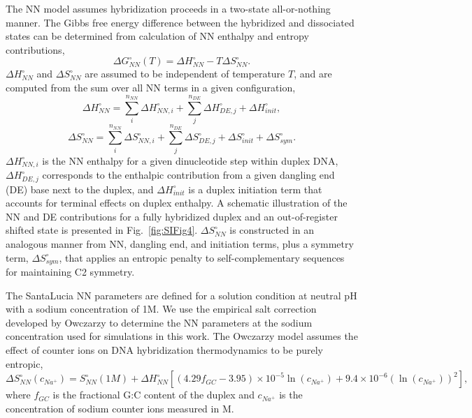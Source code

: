 \documentclass[journal=jpcbfk,manuscript=article]{achemso}
\begin{document}
The NN model assumes hybridization proceeds in a two-state all-or-nothing manner. The Gibbs free energy difference between the hybridized and dissociated states can be determined from calculation of NN enthalpy and entropy contributions,
\begin{equation}\label{SIe1}
\Delta G_{NN}^{\circ}(T) = \Delta H_{NN}^{\circ} - T\Delta S_{NN}^{\circ}.
\end{equation}
$\Delta H_{NN}^{\circ}$ and $\Delta S_{NN}^{\circ}$ are assumed to be independent of temperature $T$, and are computed from the sum over all NN terms in a given configuration,
\begin{equation}\label{SIe2}
\Delta H_{NN}^{\circ} = \sum_{i}^{n_{NN}}\Delta H_{NN, i}^{\circ} + \sum_{j}^{n_{DE}}\Delta H_{DE, j}^{\circ} + \Delta H_{init}^{\circ},
\end{equation}
\begin{equation}\label{SIe3}
\Delta S_{NN}^{\circ} = \sum_{i}^{n_{NN}}\Delta S_{NN, i}^{\circ} + \sum_{j}^{n_{DE}}\Delta S_{DE, j}^{\circ} + \Delta S_{init}^{\circ} + \Delta S_{sym}^{\circ}.
\end{equation}                          
$\Delta H_{NN, i}^{\circ}$ is the NN enthalpy for a given dinucleotide step within duplex DNA, $\Delta H_{DE, j}^{\circ}$ corresponds to the enthalpic contribution from a given dangling end (DE) base next to the duplex\citep{Santalucia2004TM}, and $\Delta H_{init}^{\circ}$ is a duplex initiation term that accounts for terminal effects on duplex enthalpy. A schematic illustration of the NN and DE contributions for a fully hybridized duplex and an out-of-register shifted state is presented in Fig.~\ref{fig:SIFig4}. $\Delta S_{NN}^{\circ}$ is constructed in an analogous manner from NN, dangling end, and initiation terms, plus a symmetry term, $\Delta S_{sym}^{\circ}$, that applies an entropic penalty to self-complementary sequences for maintaining C2 symmetry. 

The SantaLucia NN parameters are defined for a solution condition at neutral pH with a sodium concentration of 1M. We use the empirical salt correction developed by Owczarzy\citep{Owczarzy2008PredictingCations} to determine the NN parameters at the sodium concentration used for simulations in this work. The Owczarzy model assumes the effect of counter ions on DNA hybridization thermodynamics to be purely entropic,
\begin{equation}\label{SIe4}
\Delta S_{NN}^{\circ}(c_{Na^+}) = S_{NN}^{\circ}(1M) + \Delta H_{NN}^{\circ}[(4.29f_{GC}-3.95)\times 10^{-5} \ln{(c_{Na^+})}+ 9.4\times 10^{-6} (\ln{(c_{Na^+})})^2],
\end{equation} 
where $f_{GC}$ is the fractional G:C content of the duplex and $c_{Na^+}$ is the concentration of sodium counter ions measured in M.  
\end{document}
